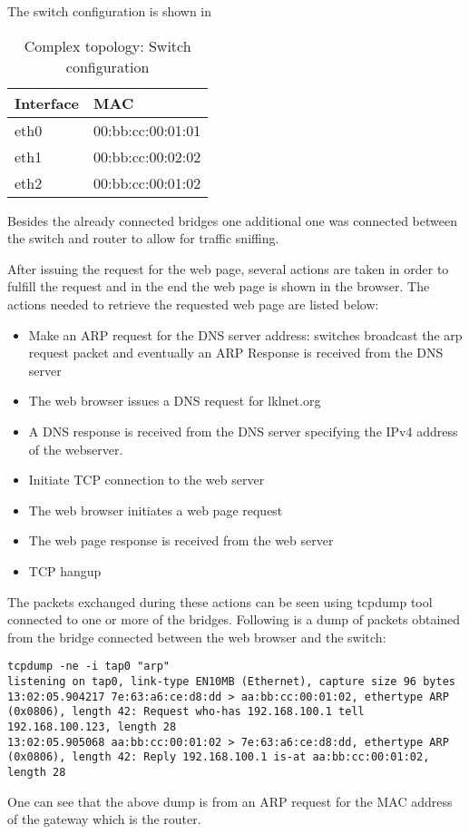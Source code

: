 The switch configuration is shown in 
\begin{center}
  \begin{table}[htb]
  \begin{center}
  \begin{tabular}{| l | l |}
    \hline
	Interface & MAC\\ \hline
	eth0 & 00:bb:cc:00:01:01\\ \hline
	eth1 & 00:bb:cc:00:02:02\\ \hline
	eth2 & 00:bb:cc:00:01:02\\
    \hline
  \end{tabular}
  \end{center}
  \caption{Complex topology: Switch configuration}
  \label{table:complex-switch}
  \end{table}
\end{center}
Besides the already connected bridges one additional one was connected between the switch and router to allow for traffic sniffing.

After issuing the request for the web page, several actions are taken in order to fulfill the request and in the end the web page is shown in the browser.
The actions needed to retrieve the requested web page are listed below:
\begin{itemize}
	\item Make an ARP request for the DNS server address: switches broadcast the arp request packet and eventually an ARP Response is received from the DNS server
	\item The web browser issues a  DNS request for lklnet.org
	\item A DNS response is received from the DNS server specifying the IPv4 address of the webserver.
	\item Initiate TCP connection to the web server
	\item The web browser initiates a web page request
	\item The web page response is received from the web server
	\item TCP hangup
\end{itemize}
The packets exchanged during these actions can be seen using tcpdump tool connected to one or more of the bridges.
Following is a dump of packets obtained from the bridge connected between the web browser and the switch:
\lstset{language=TeX,caption=,label=tcpdump}
\begin{lstlisting}
tcpdump -ne -i tap0 "arp"
listening on tap0, link-type EN10MB (Ethernet), capture size 96 bytes
13:02:05.904217 7e:63:a6:ce:d8:dd > aa:bb:cc:00:01:02, ethertype ARP (0x0806), length 42: Request who-has 192.168.100.1 tell 192.168.100.123, length 28
13:02:05.905068 aa:bb:cc:00:01:02 > 7e:63:a6:ce:d8:dd, ethertype ARP (0x0806), length 42: Reply 192.168.100.1 is-at aa:bb:cc:00:01:02, length 28
\end{lstlisting}
One can see that the above dump is from an ARP request for the MAC address of the gateway which is the router. 


